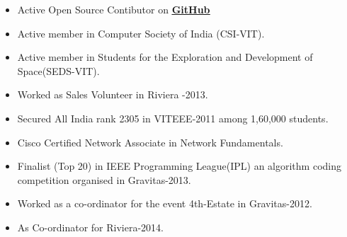 \documentclass[9pt]{article}
\newenvironment{changemargin}[2]{%
  \begin{list}{}{%
    \setlength{\topsep}{0pt}%
    \setlength{\leftmargin}{#1}%
    \setlength{\rightmargin}{#2}%
    \setlength{\listparindent}{\parindent}%
    \setlength{\itemindent}{\parindent}%
    \setlength{\parsep}{\parskip}%
  }%
  \item[]}{\end{list}
}
\newenvironment{body} {
	\vspace*{-16pt}
	\begin{changemargin}{-0.25in}{-0.5in}
  }	
	{\end{changemargin}
}
\begin{document}
\begin{body}
	\vspace{14pt}
	\begin{itemize} \itemsep -0pt
		\item Active Open Source Contibutor on \underline{\textbf{ \href{http://www.github.com/sridharreddy7}{GitHub}}}
		\item Active member in Computer Society of India (CSI-VIT).
		\item Active member in Students for the Exploration and Development of Space(SEDS-VIT).
		\item Worked as Sales Volunteer in Riviera -2013.
		\item Secured All India rank 2305 in VITEEE-2011 among 1,60,000 students.
		\item Cisco Certified Network Associate in Network Fundamentals.
		\item Finalist (Top 20)  in IEEE Programming League(IPL) an algorithm coding competition organised in Gravitas-2013.
		\item Worked as a co-ordinator for the event 4th-Estate in Gravitas-2012.
		\item As Co-ordinator for Riviera-2014.


	\end{itemize}
\end{body}

\end{document}
